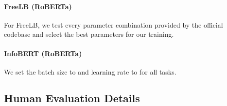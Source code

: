 \documentclass{article}
\begin{document}
\paragraph{FreeLB (RoBERTa)} For FreeLB, we test every parameter combination provided by the official codebase and select the best parameters for our training.

\paragraph{InfoBERT (RoBERTa)} We set the batch size to  and learning rate to  for all tasks.


\subsection{Human Evaluation Details}
\end{document}
